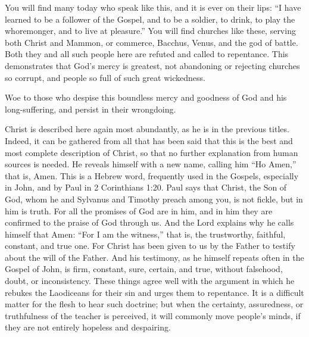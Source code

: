 You will find many today who speak like this, and it is ever on their lips: “I have learned to be a follower of the Gospel, and to be a soldier, to drink, to play the whoremonger, and to live at pleasure.” You will find churches like these, serving both Christ and Mammon, or commerce, Bacchus, Venus, and the god of battle. Both they and all such people here are refuted and called to repentance. This demonstrates that God’s mercy is greatest, not abandoning or rejecting churches so corrupt, and people so full of such great wickedness.

Woe to those who despise this boundless mercy and goodness of God and his long-suffering, and persist in their wrongdoing.

Christ is described here again most abundantly, as he is in the previous titles. Indeed, it can be gathered from all that has been said that this is the best and most complete description of Christ, so that no further explanation from human sources is needed. He reveals himself with a new name, calling him “Ho Amen,” that is, Amen. This is a Hebrew word, frequently used in the Gospels, especially in John, and by Paul in 2 Corinthians 1:20. Paul says that Christ, the Son of God, whom he and Sylvanus and Timothy preach among you, is not fickle, but in him is truth. For all the promises of God are in him, and in him they are confirmed to the praise of God through us. And the Lord explains why he calls himself that Amen: “For I am the witness,” that is, the trustworthy, faithful, constant, and true one. For Christ has been given to us by the Father to testify about the will of the Father. And his testimony, as he himself repeats often in the Gospel of John, is firm, constant, sure, certain, and true, without falsehood, doubt, or inconsistency. These things agree well with the argument in which he rebukes the Laodiceans for their sin and urges them to repentance. It is a difficult matter for the flesh to hear such doctrine; but when the certainty, assuredness, or truthfulness of the teacher is perceived, it will commonly move people’s minds, if they are not entirely hopeless and despairing.

